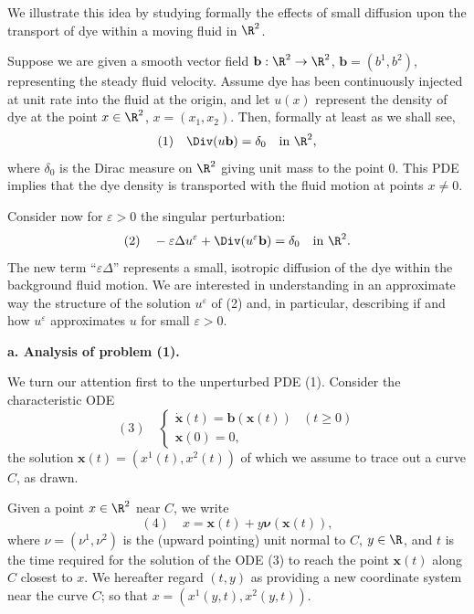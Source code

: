 \begin{example}
\label{ex:transport-small-diffusion-singular-perturbation}
We illustrate this idea by studying formally the effects of small diffusion upon the transport of dye within a moving fluid in $\R^2$.

\begin{figure}[h]\centering
\end{figure}

Suppose we are given a smooth vector field $\mathbf{b}:\R^2\to\R^2$, $\mathbf{b}=(b^1,b^2)$, representing the steady fluid velocity. Assume dye has been continuously injected at unit rate into the fluid at the origin, and let $u(x)$ represent the density of dye at the point $x\in\R^2$, $x=(x_1,x_2)$. Then, formally at least as we shall see,
$$(1) \quad \Div(u\mathbf{b}) = \delta_0 \quad \text{in } \R^2,$$
where $\delta_0$ is the Dirac measure on $\R^2$ giving unit mass to the point 0. This PDE implies that the dye density is transported with the fluid motion at points $x\neq 0$.

Consider now for $\varepsilon>0$ the singular perturbation:
$$(2) \quad -\varepsilon\Delta u^\varepsilon + \Div(u^\varepsilon\mathbf{b}) = \delta_0 \quad \text{in } \R^2.$$
The new term ``$\varepsilon\Delta$'' represents a small, isotropic diffusion of the dye within the background fluid motion. We are interested in understanding in an approximate way the structure of the solution $u^\varepsilon$ of (2) and, in particular, describing if and how $u^\varepsilon$ approximates $u$ for small $\varepsilon>0$.

\textbf{a. Analysis of problem (1).}

We turn our attention first to the unperturbed PDE (1). Consider the characteristic ODE
$$(3) \quad \begin{cases} \dot{\mathbf{x}}(t) = \mathbf{b}(\mathbf{x}(t)) & (t\ge 0) \\ \mathbf{x}(0) = 0, \end{cases}$$
the solution $\mathbf{x}(t)=(x^1(t),x^2(t))$ of which we assume to trace out a curve $C$, as drawn.

Given a point $x\in\R^2$ near $C$, we write
$$(4) \quad x = \mathbf{x}(t) + y\boldsymbol\nu(\mathbf{x}(t)),$$
where $\nu = (\nu^1, \nu^2)$ is the (upward pointing) unit normal to $C$, $y \in \R$, and $t$ is the time required for the solution of the ODE (3) to reach the point $\mathbf{x}(t)$ along $C$ closest to $x$. We hereafter regard $(t,y)$ as providing a new coordinate system near the curve $C$; so that $x = (x^1(y,t), x^2(y,t))$.


\end{example}
